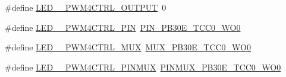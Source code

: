 \begin{DoxyCompactItemize}
\item 
\#define \mbox{\hyperlink{group__samd21__xplained__pro__features__group_ga43bb0db8e9ccd8c4add4b1fc0b8e7f12}{L\+E\+D\+\_\+\_\+\+P\+W\+M4\+C\+T\+R\+L\+\_\+\+O\+U\+T\+P\+UT}}~0
\item 
\#define \mbox{\hyperlink{group__samd21__xplained__pro__features__group_gaaa92d7fc6e068547c5eb03d646b91665}{L\+E\+D\+\_\+\_\+\+P\+W\+M4\+C\+T\+R\+L\+\_\+\+P\+IN}}~\mbox{\hyperlink{pio_2samd21j18a_8h_a7d988f237e01b9124bee7d1e7b422315}{P\+I\+N\+\_\+\+P\+B30\+E\+\_\+\+T\+C\+C0\+\_\+\+W\+O0}}
\item 
\#define \mbox{\hyperlink{group__samd21__xplained__pro__features__group_gac12a88456204503e574cb5adb106a959}{L\+E\+D\+\_\+\_\+\+P\+W\+M4\+C\+T\+R\+L\+\_\+\+M\+UX}}~\mbox{\hyperlink{pio_2samd21j18a_8h_a7aea9cbc7e93adc304673dd29e7b13ae}{M\+U\+X\+\_\+\+P\+B30\+E\+\_\+\+T\+C\+C0\+\_\+\+W\+O0}}
\item 
\#define \mbox{\hyperlink{group__samd21__xplained__pro__features__group_gaf65e221d66d5ee899dc2fc2b1c264a01}{L\+E\+D\+\_\+\_\+\+P\+W\+M4\+C\+T\+R\+L\+\_\+\+P\+I\+N\+M\+UX}}~\mbox{\hyperlink{pio_2samd21j18a_8h_a4cf0084dd2785676f29c8f84cb5ec96d}{P\+I\+N\+M\+U\+X\+\_\+\+P\+B30\+E\+\_\+\+T\+C\+C0\+\_\+\+W\+O0}}
\end{DoxyCompactItemize}
